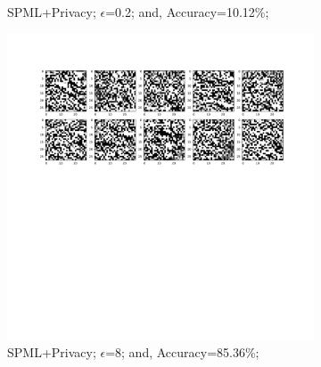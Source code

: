 \begin{figure}
\begin{subfigure}{.325\textwidth}
         \vspace{-8em}
         \caption{SPML+Privacy; $\epsilon$=0.2; and, Accuracy=10.12\%;}
         \label{fig:nativeEps.2}
     \end{subfigure}
     \begin{subfigure}{.325\textwidth}
         \includegraphics[width=\textwidth]{images/Native_attack/Mnistattack8.pdf}
         \vspace{-8em}
         \caption{SPML+Privacy; $\epsilon$=8; and, Accuracy=85.36\%;}
         \label{fig:nativeEps8}
     \end{subfigure}
        \caption{Model inversion attack images - Native mode without Intel SGX and SCONE}
     \begin{subfigure}{.325\textwidth}

\end{subfigure}
\end{figure}
